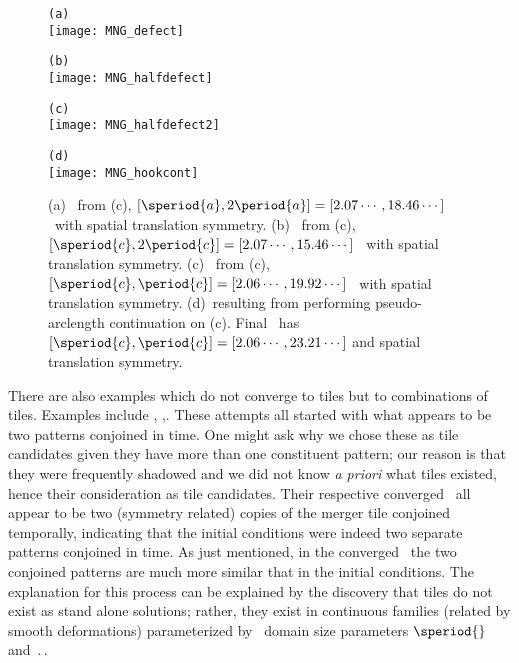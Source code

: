 \begin{figure}
\begin{minipage}[height=.2\textheight]{.5\textwidth}
\centering \small{\texttt{(a)}}\\
\texttt{[image: MNG\_defect]}
\end{minipage}
\begin{minipage}[height=.2\textheight]{.5\textwidth}
\centering \small{\texttt{(b)}}\\
\texttt{[image: MNG\_halfdefect]}
\end{minipage}
\begin{minipage}[height=.2\textheight]{.5\textwidth}
\centering \small{\texttt{(c)}}\\
\texttt{[image: MNG\_halfdefect2]}
\end{minipage}
\begin{minipage}[height=.2\textheight]{.5\textwidth}
\centering \small{\texttt{(d)}}\\
\texttt{[image: MNG\_hookcont]}
\end{minipage}
\caption{ \label{fig:tilerepeats}
(a) \twoT\ from (c), $[\speriod{a},2\period{a}]=[2.07\cdots,18.46\cdots]$ \twot\
with spatial translation symmetry.
(b) \twoT\ from (c), $[\speriod{c},2\period{c}]=[2.07\cdots,15.46\cdots]$ \twot\
with spatial translation symmetry.
(c) \twoT\ from \reffig{fig:halfdefect2}(c), $[\speriod{c},\period{c}]=[2.06\cdots,19.92\cdots]$ \twot\
with spatial translation symmetry.
(d)\twoT\ resulting from performing pseudo-arclength continuation
on \reffig{fig:hook}(c). Final \twot\ has $[\speriod{c},\period{c}]=[2.06\cdots,23.21\cdots]$
and spatial translation symmetry.
}
\end{figure}

There are also examples which do not converge to tiles but to
combinations of tiles. Examples include ,
,. These attempts
all started with what appears to be two patterns conjoined in time.
One might ask why we chose these as tile candidates given
they have more than one constituent pattern; our reason is that
they were frequently shadowed and we did not know \textit{a priori} what
tiles existed, hence their consideration as tile candidates.
Their respective converged \twots\ all
appear to be two (symmetry related) copies of the
merger tile conjoined temporally, indicating that the initial conditions
were indeed two separate patterns conjoined in time. As just mentioned,
in the converged \twots\ the two conjoined patterns are much more similar
that in the initial conditions. The explanation for this process can be explained
by the discovery that tiles do not exist as stand alone solutions; rather, they
exist in continuous families (related by smooth deformations) parameterized by
\spt\ domain size parameters $\speriod{}$ and $\period{}$.

